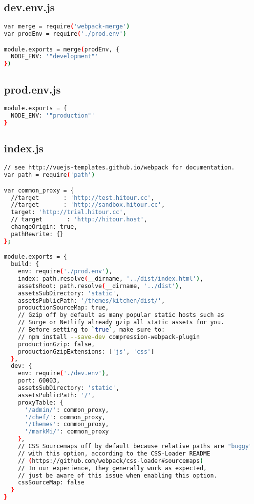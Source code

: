\subsection{dev.env.js}


\begin{lstlisting}[language=bash]
var merge = require('webpack-merge')
var prodEnv = require('./prod.env')

module.exports = merge(prodEnv, {
  NODE_ENV: '"development"'
})
\end{lstlisting}


\subsection{prod.env.js}



\begin{lstlisting}[language=bash]
module.exports = {
  NODE_ENV: '"production"'
}
\end{lstlisting}

\subsection{index.js}

\begin{lstlisting}[language=bash]
// see http://vuejs-templates.github.io/webpack for documentation.
var path = require('path')

var common_proxy = {
  //target       : 'http://test.hitour.cc',
  //target       : 'http://sandbox.hitour.cc',
  target: 'http://trial.hitour.cc',
  // target       : 'http://hitour.host',
  changeOrigin: true,
  pathRewrite: {}
};

module.exports = {
  build: {
    env: require('./prod.env'),
    index: path.resolve(__dirname, '../dist/index.html'),
    assetsRoot: path.resolve(__dirname, '../dist'),
    assetsSubDirectory: 'static',
    assetsPublicPath: '/themes/kitchen/dist/',
    productionSourceMap: true,
    // Gzip off by default as many popular static hosts such as
    // Surge or Netlify already gzip all static assets for you.
    // Before setting to `true`, make sure to:
    // npm install --save-dev compression-webpack-plugin
    productionGzip: false,
    productionGzipExtensions: ['js', 'css']
  },
  dev: {
    env: require('./dev.env'),
    port: 60003,
    assetsSubDirectory: 'static',
    assetsPublicPath: '/',
    proxyTable: {
      '/admin/': common_proxy,
      '/chef/': common_proxy,
      '/themes': common_proxy,
      '/markMi/': common_proxy
    },
    // CSS Sourcemaps off by default because relative paths are "buggy"
    // with this option, according to the CSS-Loader README
    // (https://github.com/webpack/css-loader#sourcemaps)
    // In our experience, they generally work as expected,
    // just be aware of this issue when enabling this option.
    cssSourceMap: false
  }
}
\end{lstlisting}

